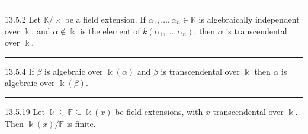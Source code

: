 \documentclass[a4paper, 12pt]{article}
\begin{document}
\noindent\rule{7in}{2.8pt}
\begin{problem}{13.5.2}
Let \(\mathbb{K}/\Bbbk\) be a field extension. If \(\alpha_1,\ldots,\alpha_n\in \mathbb{K}\) is algebraically independent over \(\Bbbk\), and \(\alpha\notin \Bbbk\) is the element of \(k(\alpha_1,\ldots,\alpha_n)\), then \(\alpha\) is transcendental over \(\Bbbk\). 
\end{problem}
\begin{solution}

\end{solution}

\noindent\rule{7in}{2.8pt}
\begin{problem}{13.5.4}
If \(\beta\) is algebraic over \(\Bbbk(\alpha)\) and \(\beta\) is transcendental over \(\Bbbk\) then \(\alpha\) is algebraic over \(\Bbbk(\beta)\).
\end{problem}
\begin{solution}

\end{solution}

\noindent\rule{7in}{2.8pt}
\begin{problem}{13.5.19}
Let \(\Bbbk \subsetneq\mathbb{F}\subseteq\Bbbk(x)\) be field extensions, with \(x\) transcendental over \(\Bbbk\). Then \(\Bbbk(x)/\mathbb{F}\) is finite. 
\end{problem}
\begin{solution}

\end{solution}
\end{document}
